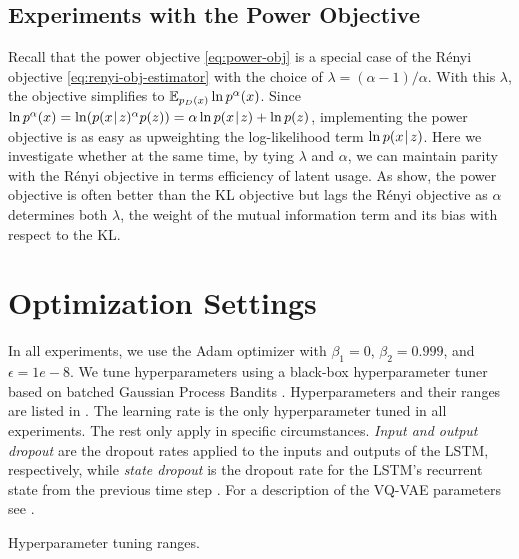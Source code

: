 \begin{subappendices}
\subsection{Experiments with the Power Objective}
\label{sec:micmco-experiments-with-the-power-objective}

Recall that the power objective \eqref{eq:power-obj} is a special case
of the Rényi objective \eqref{eq:renyi-obj-estimator} with the choice of $\lambda = (\alpha-1)/\alpha$.
With this $\lambda$, the objective simplifies to $\mathop{{}\mathbb{E}}_{p_D(x)} \ln p^\alpha(x)$.
Since $\ln p^\alpha(x) = \ln(p(x\hspace{0.08em}|\hspace{0.11em} z)^{\alpha} p(z)) = \alpha \ln p(x\hspace{0.08em}|\hspace{0.11em} z) + \ln p(z)$, implementing the power objective is as easy as upweighting the log-likelihood term $\ln p(x\hspace{0.08em}|\hspace{0.11em} z)$.
Here we investigate whether at the same time, by tying $\lambda$ and $\alpha$, we can maintain parity with the Rényi objective in terms efficiency of latent usage.
As  show, the power objective is often better than the KL objective but lags the Rényi objective as $\alpha$ determines both $\lambda$, the weight of the mutual information term and its bias with respect to the KL.

\section{Optimization Settings}
\label{sec:optimization-settings}

In all experiments, we use the Adam optimizer \citep{kingma2014adam} with $\beta_1=0$, $\beta_2=0.999$, and $\epsilon=1e-8$.
We tune hyperparameters using a black-box hyperparameter tuner based on batched Gaussian Process Bandits \citep{golovin2017google}.
Hyperparameters and their ranges are listed in .
The learning rate is the only hyperparameter tuned in all experiments.
The rest only apply in specific circumstances.
\emph{Input and output dropout} are the dropout rates applied to the inputs and outputs of the LSTM, respectively, while \emph{state dropout} is the dropout rate for the LSTM's recurrent state from the previous time step \citep{gal2016theoretically}.
For a description of the VQ-VAE parameters see \citet{van2017neural}.

\begin{table}
  \caption{Hyperparameter tuning ranges.}
  \label{tab:hp-ranges}


\end{table}
\end{subappendices}
